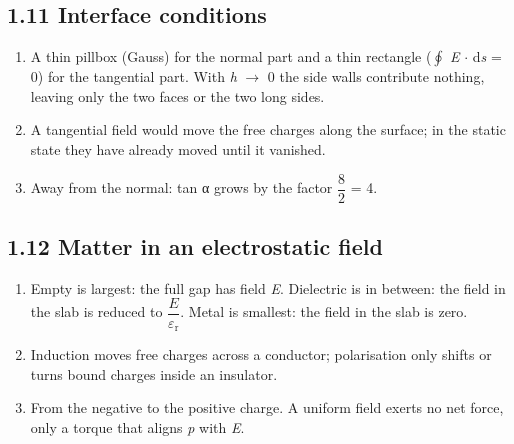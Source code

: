 \documentclass[11pt]{article}
\begin{document}
\begin{keepsection}\subsection{1.11 Interface conditions}

\begin{enumerate}
\item A thin pillbox (Gauss) for the normal part and a thin rectangle ($\oint $ \textit{E} \ensuremath{\cdot} d\textit{s} = 0) for the tangential part. With \textit{h} \ensuremath{\to} 0 the side walls contribute nothing, leaving only the two faces or the two long sides.
\item A tangential field would move the free charges along the surface; in the static state they have already moved until it vanished.
\item Away from the normal: tan α grows by the factor {\small\ensuremath{\dfrac{8}{2}}} = 4.
\end{enumerate}

\end{keepsection}
\begin{keepsection}\subsection{1.12 Matter in an electrostatic field}

\begin{enumerate}
\item Empty is largest: the full gap has field \textit{E}. Dielectric is in between: the field in the slab is reduced to {\small\ensuremath{\dfrac{{E}}{ε_{\mathrm{r}}}}}. Metal is smallest: the field in the slab is zero.
\item Induction moves free charges across a conductor; polarisation only shifts or turns bound charges inside an insulator.
\item From the negative to the positive charge. A uniform field exerts no net force, only a torque that aligns \textit{p} with \textit{E}.
\end{enumerate}

\end{keepsection}
\end{document}

